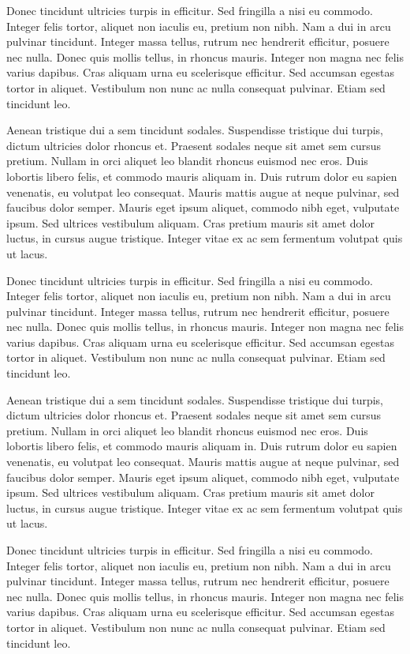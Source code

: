 Donec tincidunt ultricies turpis in efficitur. Sed fringilla a nisi eu commodo. Integer felis tortor, aliquet non iaculis eu, pretium non nibh. Nam a dui in arcu pulvinar tincidunt. Integer massa tellus, rutrum nec hendrerit efficitur, posuere nec nulla. Donec quis mollis tellus, in rhoncus mauris. Integer non magna nec felis varius dapibus. Cras aliquam urna eu scelerisque efficitur. Sed accumsan egestas tortor in aliquet. Vestibulum non nunc ac nulla consequat pulvinar. Etiam sed tincidunt leo.

Aenean tristique dui a sem tincidunt sodales. Suspendisse tristique dui turpis, dictum ultricies dolor rhoncus et. Praesent sodales neque sit amet sem cursus pretium. Nullam in orci aliquet leo blandit rhoncus euismod nec eros. Duis lobortis libero felis, et commodo mauris aliquam in. Duis rutrum dolor eu sapien venenatis, eu volutpat leo consequat. Mauris mattis augue at neque pulvinar, sed faucibus dolor semper. Mauris eget ipsum aliquet, commodo nibh eget, vulputate ipsum. Sed ultrices vestibulum aliquam. Cras pretium mauris sit amet dolor luctus, in cursus augue tristique. Integer vitae ex ac sem fermentum volutpat quis ut lacus.

Donec tincidunt ultricies turpis in efficitur. Sed fringilla a nisi eu commodo. Integer felis tortor, aliquet non iaculis eu, pretium non nibh. Nam a dui in arcu pulvinar tincidunt. Integer massa tellus, rutrum nec hendrerit efficitur, posuere nec nulla. Donec quis mollis tellus, in rhoncus mauris. Integer non magna nec felis varius dapibus. Cras aliquam urna eu scelerisque efficitur. Sed accumsan egestas tortor in aliquet. Vestibulum non nunc ac nulla consequat pulvinar. Etiam sed tincidunt leo.

Aenean tristique dui a sem tincidunt sodales. Suspendisse tristique dui turpis, dictum ultricies dolor rhoncus et. Praesent sodales neque sit amet sem cursus pretium. Nullam in orci aliquet leo blandit rhoncus euismod nec eros. Duis lobortis libero felis, et commodo mauris aliquam in. Duis rutrum dolor eu sapien venenatis, eu volutpat leo consequat. Mauris mattis augue at neque pulvinar, sed faucibus dolor semper. Mauris eget ipsum aliquet, commodo nibh eget, vulputate ipsum. Sed ultrices vestibulum aliquam. Cras pretium mauris sit amet dolor luctus, in cursus augue tristique. Integer vitae ex ac sem fermentum volutpat quis ut lacus.

Donec tincidunt ultricies turpis in efficitur. Sed fringilla a nisi eu commodo. Integer felis tortor, aliquet non iaculis eu, pretium non nibh. Nam a dui in arcu pulvinar tincidunt. Integer massa tellus, rutrum nec hendrerit efficitur, posuere nec nulla. Donec quis mollis tellus, in rhoncus mauris. Integer non magna nec felis varius dapibus. Cras aliquam urna eu scelerisque efficitur. Sed accumsan egestas tortor in aliquet. Vestibulum non nunc ac nulla consequat pulvinar. Etiam sed tincidunt leo.


